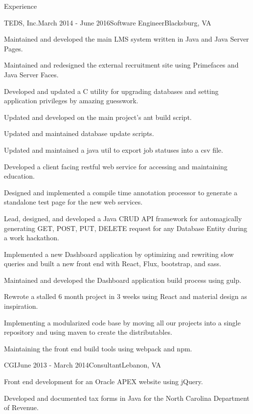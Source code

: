 \documentclass{resume} %
\begin{document}
\begin{rSection}{Experience}
\begin{rSubsection}{TEDS, Inc.}{March 2014 - June 2016}{Software Engineer}{Blacksburg, VA}
\item Maintained and developed the main LMS system written in Java and Java Server Pages.
\item Maintained and redesigned the external recruitment site using Primefaces and Java Server Faces.
\item Developed and updated a C utility for upgrading databases and setting application privileges by amazing guesswork.
\item Updated and developed on the main project's ant build script.
\item Updated and maintained database update scripts.
\item Updated and maintained a java util to export job statuses into a csv file.
\item Developed a client facing restful web service for accessing and maintaining education.
\item Designed and implemented a compile time annotation processor to generate a standalone test page for the new web services.
\item Lead, designed, and developed a Java CRUD API framework for automagically generating GET, POST, PUT, DELETE request for any Database Entity during a work hackathon.
\item Implemented a new Dashboard application by optimizing and rewriting slow queries and built a new front end with React, Flux, bootstrap, and sass.
\item Maintained and developed the Dashboard application build process using gulp.
\item Rewrote a stalled 6 month project in 3 weeks using React and material design as inspiration.
\item Implementing a modularized code base by moving all our projects into a single repository and using maven to create the distributables.
\item Maintaining the front end build tools using webpack and npm.
\end{rSubsection}


\begin{rSubsection}{CGI}{June 2013 - March 2014}{Consultant}{Lebanon, VA}
\item Front end development for an Oracle APEX website using jQuery.
\item Developed and documented tax forms in Java for the North Carolina Department of Revenue.
\end{rSubsection}


\end{rSection}
\end{document}
